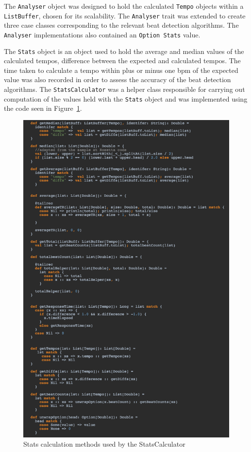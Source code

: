 \documentclass[a4paper, 11pt]{article}
\begin{document}
The \texttt{Analyser} object was designed to hold the calculated \texttt{Tempo} objects within a \texttt{ListBuffer}, chosen for its scalability. The \texttt{Analyser} trait was extended to create three case classes corresponding to the relevant beat detection algorithms. The \texttt{Analyser} implementations also contained an \texttt{Option Stats} value.\par
The \texttt{Stats} object is an object used to hold the average and median values of the calculated tempos, difference between the expected and calculated tempos. The time taken to calculate a tempo within plus or minus one bpm of the expected value was also recorded in order to assess the accuracy of the beat detection algorithms. The \texttt{StatsCalculator} was a helper class responsible for carrying out computation of the values held with the \texttt{Stats} object and was implemented using the code seen in Figure~\ref{fig: statsC}.

\begin{figure}[h]
\centering
\includegraphics[scale=0.35]{images/statscalc.jpg}
\caption{Stats calculation methods used by the StatsCalculator}
\label{fig: statsC}
\end{figure}
\end{document}
